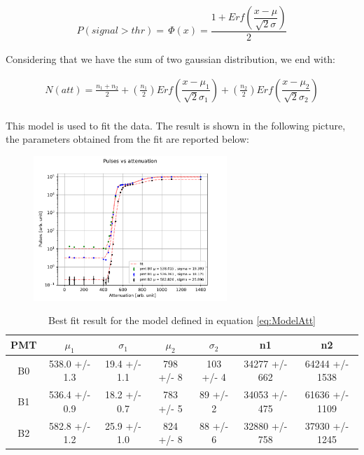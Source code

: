 \begin{align*}
P(signal > thr) = \, \Phi(x) = \dfrac{1 + Erf(\dfrac{x - \mu}{\sqrt{2} \sigma })}{2}
\end{align*}

Considering that we have the sum of two gaussian distribution, we end with:

\begin{equation} \label{eq:ModelAtt}
\begin{split}
N(att) = \frac{n_{1} + n_{2}}{2} + (\frac{n_{1}}{2}) Erf(\dfrac{x - \mu_{1}}{\sqrt{2} \sigma_{1} })   + (\frac{n_{2}}{2}) Erf(\dfrac{x - \mu_{2}}{\sqrt{2} \sigma_{2}}) \\
\end{split}
\end{equation}

This model is used to fit the data. The result is shown in the following picture, the parameters obtained from the fit are reported below:

\begin{figure}[!ht]
\centering
\includegraphics[width = 0.65\textwidth ]{Analysis/CalibrationPMT/Fit_attenuation.pdf}
\end{figure}

\begin{table}[!ht]
\centering
\begin{tabular}{c|c|c|c|c|c|c}
\hline
 PMT   &  $\mu_{1}$         &  $\sigma_{1}$         & $\mu_{2}$          & $\sigma_{2}$   & n1                & n2                 \\
\hline
 B0    & 538.0 +/- 1.3 & 19.4 +/- 1.1 & 798 +/- 8 & 103 +/- 4 & 34277 +/- 662 & 64244 +/- 1538 \\
 B1    & 536.4 +/- 0.9 & 18.2 +/- 0.7 & 783 +/- 5 & 89 +/- 2  & 34053 +/- 475 & 61636 +/- 1109 \\
 B2    & 582.8 +/- 1.2 & 25.9 +/- 1.0 & 824 +/- 8 & 88 +/- 6  & 32880 +/- 758 & 37930 +/- 1245 \\
\hline
\end{tabular}
\caption{Best fit result for the model defined in equation \ref{eq:ModelAtt}}
\end{table}

